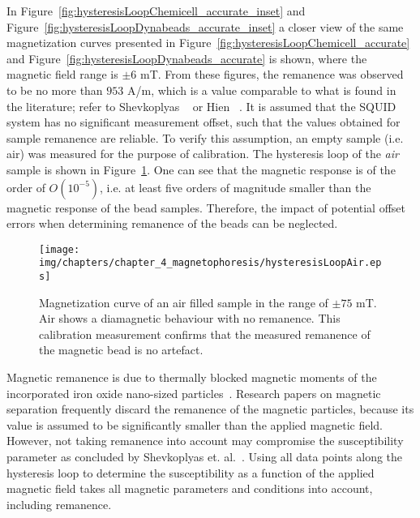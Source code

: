 In Figure~\ref{fig:hysteresisLoopChemicell_accurate_inset} and Figure~\ref{fig:hysteresisLoopDynabeads_accurate_inset} a closer view of the same magnetization curves presented in Figure~\ref{fig:hysteresisLoopChemicell_accurate} and Figure~\ref{fig:hysteresisLoopDynabeads_accurate} is shown, where the magnetic field range is $\pm6$ mT. From these figures, the remanence was observed to be no more than $953$ A/m, which is a value comparable to what is found in the literature; refer to Shevkoplyas \etal~\cite{Shevkoplyas2007} or Hien \etal~\cite{Hien2016}. It is assumed that the SQUID system has no significant measurement offset, such that the values obtained for sample remanence are reliable. To verify this assumption, an empty sample (i.e. air) was measured for the purpose of calibration. The hysteresis loop of the \textit{air} sample is shown in Figure~\ref{fig:hysteresisLoopAir}. One can see that the magnetic response is of the order of $O(10^{-5})$, i.e. at least five orders of magnitude smaller than the magnetic response of the bead samples. Therefore, the impact of potential offset errors when determining remanence of the beads can be neglected.

\begin{figure}[htb]
   \centering
   \texttt{[image: img/chapters/chapter\_4\_magnetophoresis/hysteresisLoopAir.eps]}
   \caption[Magnetization curves of an air filled sample in the range of $\pm75$ mT]{Magnetization curve of an air filled sample in the range of $\pm75$ mT. Air shows a diamagnetic behaviour with no remanence. This calibration measurement confirms that the measured remanence of the magnetic bead is no artefact.}
   \label{fig:hysteresisLoopAir}
\end{figure}

Magnetic remanence is due to thermally blocked magnetic moments of the incorporated iron oxide nano-sized particles~\cite{Fonnum2005}. Research papers on magnetic separation frequently discard the remanence of the magnetic particles, because its value is assumed to be significantly smaller than the applied magnetic field. However, not taking remanence into account may compromise the susceptibility parameter as concluded by Shevkoplyas et. al.~\cite{Shevkoplyas2007}. Using all data points along the hysteresis loop to determine the susceptibility as a function of the applied magnetic field takes all magnetic parameters and conditions into account, including remanence. 

